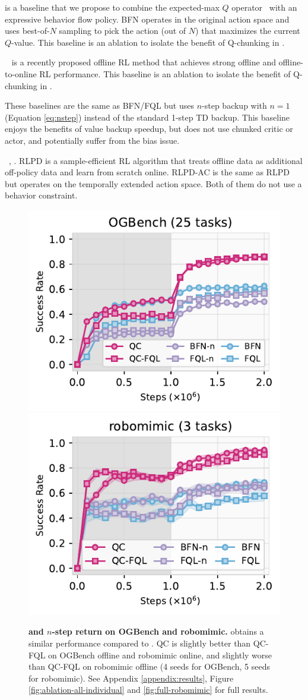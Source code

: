  is a baseline that we propose to combine the expected-max $Q$ operator~\citep{ghasemipour2021emaq} with an expressive behavior flow policy. BFN operates in the original action space and uses best-of-$N$ sampling to pick the action (out of $N$) that maximizes the current $Q$-value. This baseline is an ablation to isolate the benefit of Q-chunking in .

~\citep{park2025flow} is a recently proposed offline RL method that achieves strong offline and offline-to-online RL performance. 
This baseline is an ablation to isolate the benefit of Q-chunking in .

 These baselines are the same as BFN/FQL but uses $n$-step backup with $n=1$ (Equation \ref{eq:nstep}) instead of the standard 1-step TD backup. This baseline enjoys the benefits of value backup speedup, but does not use chunked critic or actor, and potentially suffer from the bias issue.

~\citep{ball2023efficient}, . RLPD is a sample-efficient RL algorithm that treats offline data as additional off-policy data and learn from scratch online. 
RLPD-AC is the same as RLPD but operates on the temporally extended action space. Both of them do not use a behavior constraint.


\begin{figure}
    \centering
    \includegraphics[width=0.48\linewidth]{figures/agg.pdf}  %
    \hfill
    \includegraphics[width=0.48\linewidth]{figures/robomimic-agg.pdf} %
    \caption{\footnotesize \textbf{ and $n$-step return on OGBench and robomimic.}  obtains a similar performance compared to . QC is slightly better than QC-FQL on OGBench offline and robomimic online, and slightly worse than QC-FQL on robomimic offline (4 seeds for OGBench, 5 seeds for robomimic). See Appendix \ref{appendix:results}, Figure \ref{fig:ablation-all-individual} and \ref{fig:full-robomimic} for full results.}
    \label{fig:ablation}
\end{figure}

